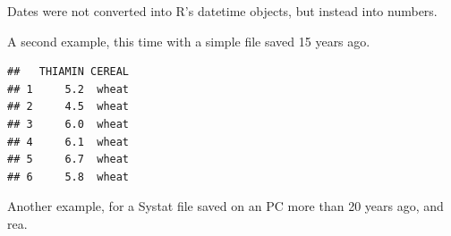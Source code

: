 \documentclass[krantz2]{krantz}\usepackage{knitr}%
\begin{document}
Dates were not converted into R's datetime objects, but instead into numbers.

A second example, this time with a simple  file saved 15 years ago.

\begin{knitrout}\footnotesize
{}\color{fgcolor}\begin{kframe}
\begin{alltt}
 \hlkwb{<-} \hlstd{(} \hlstd{=} \hlstd{,}  \hlstd{=} \hlstd{)}
\end{alltt}
\begin{verbatim}
##   THIAMIN CEREAL
## 1     5.2  wheat
## 2     4.5  wheat
## 3     6.0  wheat
## 4     6.1  wheat
## 5     6.7  wheat
## 6     5.8  wheat
\end{verbatim}
\end{kframe}
\end{knitrout}

Another example, for a Systat file saved on an PC more than 20 years ago, and rea.
\end{document}
